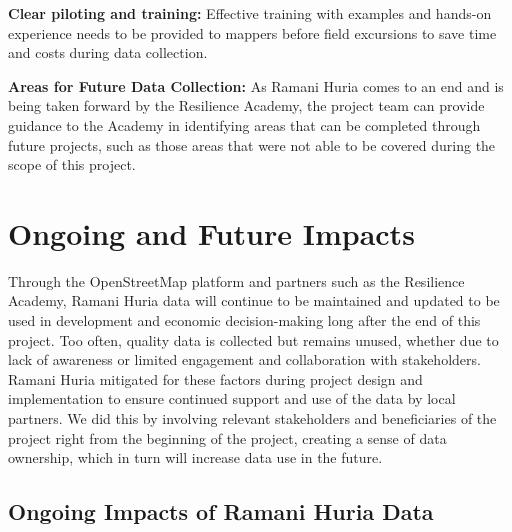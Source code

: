 \documentclass[a4paper,12pt,twoside]{article}
\begin{document}
\textbf{Clear piloting and training:} Effective training with examples and hands-on experience needs to be provided to mappers before field excursions to save time and costs during data collection.

\textbf{Areas for Future Data Collection:} As Ramani Huria comes to an end and is being taken forward by the Resilience Academy, the project team can provide guidance to the Academy in identifying areas that can be completed through future projects, such as those areas that were not able to be covered during the scope of this project.

\section{Ongoing and Future Impacts}

Through the OpenStreetMap platform and partners such as the Resilience Academy, Ramani Huria data will continue to be maintained and updated to be used in development and economic decision-making long after the end of this project. Too often, quality data is collected but remains unused, whether due to lack of awareness or limited engagement and collaboration with stakeholders. Ramani Huria mitigated for these factors during project design and implementation to ensure continued support and use of the data by local partners. We did this by involving relevant stakeholders and beneficiaries of the project right from the beginning of the project, creating a sense of data ownership, which in turn will increase data use in the future.

\subsection{Ongoing Impacts of Ramani Huria Data}
\end{document}
